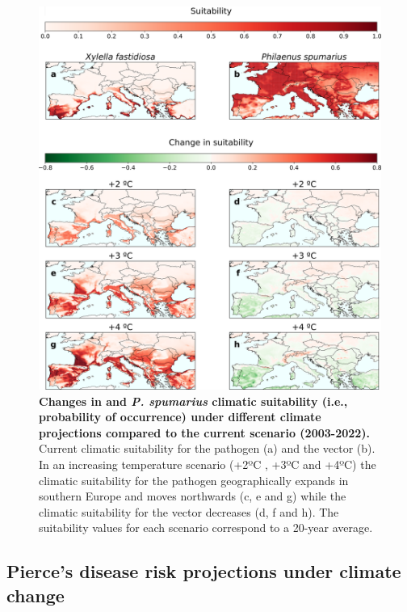 \begin{figure}[t!]
    \centering

    \includegraphics[width=\textwidth]{Figures/Xf_Ps_suitability_differences.pdf}
    \caption[Changes in \xf{} and \textit{P. spumarius} climatic
        suitability under different climate projections]{\textbf{Changes in
            \xf{}
            and \textit{P. spumarius} climatic
            suitability (i.e., probability of occurrence) under different
            climate
            projections compared to the current scenario (2003-2022).} Current
        climatic
        suitability for the pathogen (a) and the vector (b). In an increasing
        temperature scenario (+2ºC , +3ºC and +4ºC) the climatic suitability
        for the
        pathogen geographically expands in southern Europe and moves northwards
        (c, e
        and g) while the climatic suitability for the vector decreases (d, f
        and h).
        The suitability values for each scenario correspond to a 20-year
        average.}
    \label{fig:Xf_Ps_suitability_change}
\end{figure}

\subsection{Pierce's disease risk projections under climate change}

